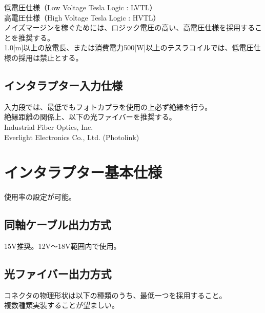 \documentclass[a4paper,11pt]{jsarticle}
\begin{document}
低電圧仕様（Low Voltage Tesla Logic : LVTL）\\
高電圧仕様（High Voltage Tesla Logic : HVTL）\\

ノイズマージンを稼ぐためには、ロジック電圧の高い、高電圧仕様を採用することを推奨する。\\

1.0[m]以上の放電長、または消費電力500[W]以上のテスラコイルでは、低電圧仕様の採用は禁止とする。


\subsection{インタラプター入力仕様}
入力段では、最低でもフォトカプラを使用の上必ず絶縁を行う。\\
絶縁距離の関係上、以下の光ファイバーを推奨する。\\
Industrial Fiber Optics, Inc.\\
Everlight Electronics Co., Ltd. (Photolink)\\


\section{インタラプター基本仕様}

使用率の設定が可能。



\subsection{同軸ケーブル出力方式}
15V推奨。12V～18V範囲内で使用。\\

\subsection{光ファイバー出力方式}
コネクタの物理形状は以下の種類のうち、最低一つを採用すること。\\
複数種類実装することが望ましい。\\
\end{document}
